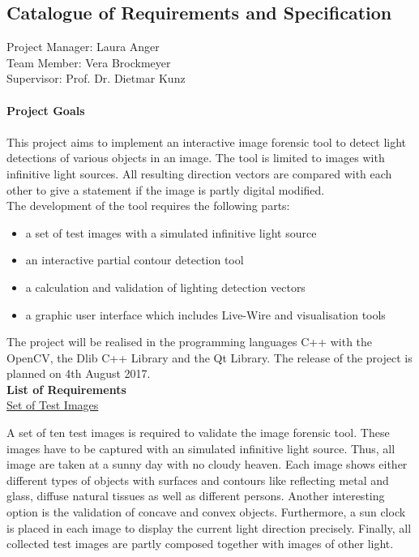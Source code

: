 \subsection{Catalogue of Requirements and Specification} \label{sec:PMcatalogue}
Project Manager: Laura Anger \\
Team Member: Vera Brockmeyer \\
Supervisor: Prof. Dr. Dietmar Kunz\\ \\
\textbf{Project Goals}\\ \\
This project aims to implement an interactive image forensic tool to detect light detections of various objects in an image. The tool is limited to images with infinitive light sources. All resulting direction vectors are compared with each other to give a statement if the image is partly digital modified.\\
 
The development of the tool requires the following parts: 
\begin{itemize}
\item a set of test images with a simulated infinitive light source
\item an interactive partial contour detection tool 
\item a calculation and validation of lighting detection vectors 
\item a graphic user interface which includes Live-Wire and visualisation tools
\end{itemize}

The project will be realised in the programming languages C++ with the OpenCV, the Dlib C++ Library and the Qt Library. The release of the project is planned on 4th August 2017. \\

\textbf{List of Requirements}\\

\underline{Set of Test Images}

A set of ten test images is required to validate the image forensic tool. These images have to be captured with an simulated infinitive light source. Thus, all image are taken at a sunny day with no cloudy heaven. Each image shows either different types of objects with surfaces and contours like reflecting metal and glass, diffuse natural tissues as well as different persons. Another interesting option is the validation of concave and convex objects. 
Furthermore, a sun clock is placed in each image to display the current light direction precisely. Finally, all collected test images are partly composed together with images of other light.\\


